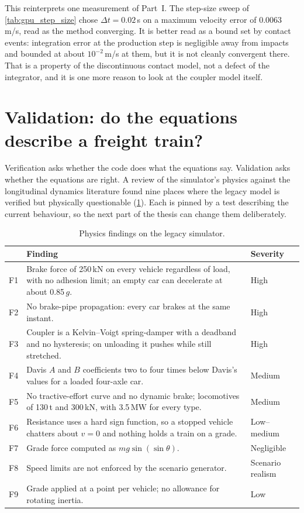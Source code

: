 This reinterprets one measurement of Part~I. The step-size sweep of \cref{tab:gpu_step_size} chose $\Delta t = 0.02$\,s on a maximum velocity error of 0.0063\,m/s, read as the method converging. It is better read as a bound set by contact events: integration error at the production step is negligible away from impacts and bounded at about $10^{-2}$\,m/s at them, but it is not cleanly convergent there. That is a property of the discontinuous contact model, not a defect of the integrator, and it is one more reason to look at the coupler model itself.

\section{Validation: do the equations describe a freight train?}
\label{sec:critique_validation}

Verification asks whether the code does what the equations say. Validation asks whether the equations are right. A review of the simulator's physics against the longitudinal dynamics literature found nine places where the legacy model is verified but physically questionable (\cref{tab:critique_findings}). Each is pinned by a test describing the current behaviour, so the next part of the thesis can change them deliberately.

\begin{table}[htbp]
    \centering
    \small
    \begin{tabular}{>{\raggedright}p{0.6cm}>{\raggedright}p{8.4cm}>{\raggedright\arraybackslash}p{2.0cm}}
        \toprule
        & Finding & Severity \\
        \midrule
        F1 & Brake force of 250\,kN on every vehicle regardless of load, with no adhesion limit; an empty car can decelerate at about 0.85\,$g$. & High \\
        F2 & No brake-pipe propagation: every car brakes at the same instant. & High \\
        F3 & Coupler is a Kelvin--Voigt spring-damper with a deadband and no hysteresis; on unloading it pushes while still stretched. & High \\
        F4 & Davis $A$ and $B$ coefficients two to four times below Davis's values for a loaded four-axle car. & Medium \\
        F5 & No tractive-effort curve and no dynamic brake; locomotives of 130\,t and 300\,kN, with 3.5\,MW for every type. & Medium \\
        F6 & Resistance uses a hard sign function, so a stopped vehicle chatters about $v = 0$ and nothing holds a train on a grade. & Low--medium \\
        F7 & Grade force computed as $mg\sin(\sin\theta)$. & Negligible \\
        F8 & Speed limits are not enforced by the scenario generator. & Scenario realism \\
        F9 & Grade applied at a point per vehicle; no allowance for rotating inertia. & Low \\
        \bottomrule
    \end{tabular}
    \caption{Physics findings on the legacy simulator.}
    \label{tab:critique_findings}
\end{table}

